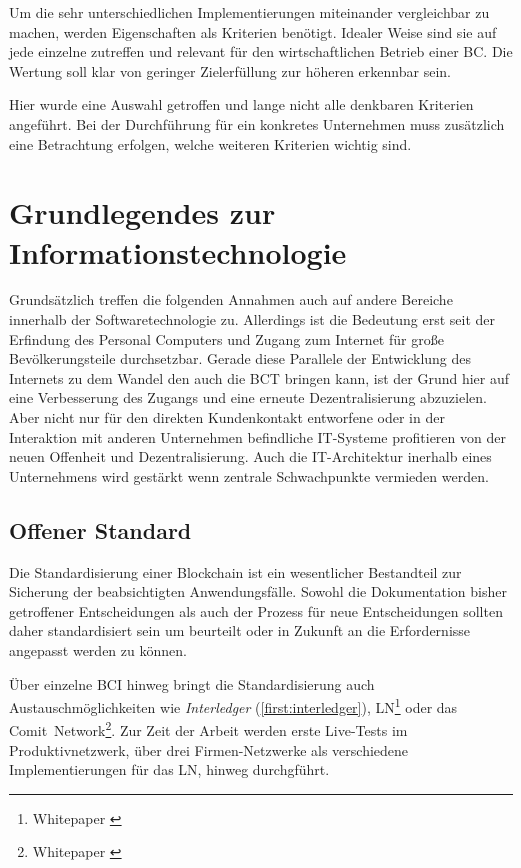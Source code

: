 Um die sehr unterschiedlichen Implementierungen miteinander vergleichbar zu machen, werden Eigenschaften als Kriterien benötigt. Idealer Weise sind sie auf jede einzelne zutreffen und relevant für den wirtschaftlichen Betrieb einer \gls{BC}.
Die Wertung soll klar von geringer Zielerfüllung zur höheren erkennbar sein.

Hier wurde eine Auswahl getroffen und lange nicht alle denkbaren Kriterien angeführt. Bei der Durchführung für ein konkretes Unternehmen muss zusätzlich eine Betrachtung erfolgen, welche weiteren Kriterien wichtig sind.

\section{Grundlegendes zur Informationstechnologie}\label{krit:it}

Grundsätzlich treffen die folgenden Annahmen auch auf andere Bereiche innerhalb der Softwaretechnologie zu.
Allerdings ist die Bedeutung erst seit der Erfindung des Personal Computers und Zugang zum Internet für große Bevölkerungsteile durchsetzbar.
Gerade diese Parallele der Entwicklung des Internets zu dem Wandel den auch die \gls{BCT} bringen kann, ist der Grund hier auf eine Verbesserung des Zugangs und eine erneute Dezentralisierung abzuzielen.
Aber nicht nur für den direkten Kundenkontakt entworfene oder in der Interaktion mit anderen Unternehmen befindliche IT-Systeme profitieren von der neuen Offenheit und Dezentralisierung. Auch die IT-Architektur inerhalb eines Unternehmens wird gestärkt wenn zentrale Schwachpunkte vermieden werden. 

%
\subsection{Offener Standard}\label{krit:openstandard}

Die Standardisierung einer Blockchain ist ein wesentlicher Bestandteil zur Sicherung der beabsichtigten Anwendungsfälle.
Sowohl die Dokumentation bisher getroffener Entscheidungen als auch der Prozess für neue Entscheidungen sollten daher standardisiert sein um beurteilt oder in Zukunft an die Erfordernisse angepasst werden zu können.

Über einzelne \gls{BCI} hinweg bringt die Standardisierung auch Austauschmöglichkeiten wie \emph{Interledger} (\ref{first:interledger}), \gls{LN}\footnote{Whitepaper \autocite{p:lightning}} oder das Comit~Network\footnote{Whitepaper \autocite{p:comit}}. Zur Zeit der Arbeit werden erste Live-Tests im Produktivnetzwerk, über drei Firmen-Netzwerke als verschiedene Implementierungen für das \gls{LN}, hinweg durchgführt.

